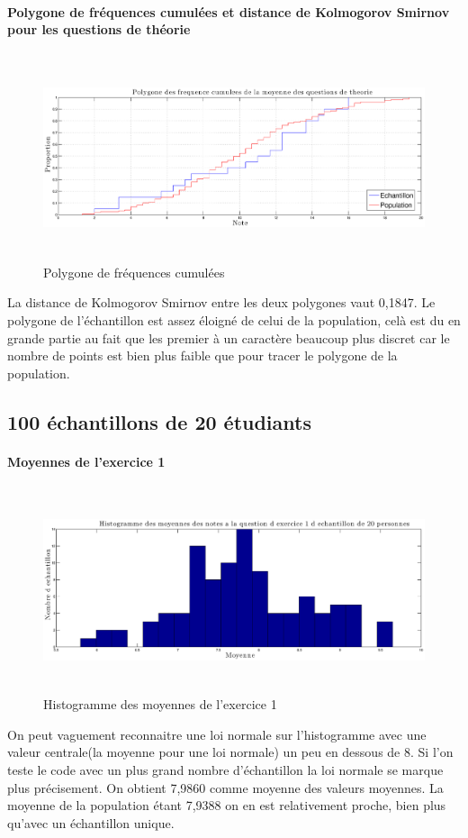 \documentclass[a4paper, 11pt]{article}
\begin{document}
	\paragraph{Polygone de fréquences cumulées et distance de Kolmogorov Smirnov pour les questions de théorie} 
	\begin{figure} [H]
	\begin{center}
		\includegraphics[height=6cm, width = 12cm]{Fig/Q2A3.eps}
		\caption{Polygone de fréquences cumulées}
		\label{Q2A3}
	\end{center}	
	\end{figure}
	La distance de Kolmogorov Smirnov entre les deux polygones vaut 0,1847. Le polygone de l'échantillon est assez éloigné de celui de la population, celà est du en grande partie au fait que les premier à un caractère beaucoup plus discret car le nombre de points est bien plus faible que pour tracer le polygone de la population.
	\subsection{100 échantillons de 20 étudiants}
\paragraph{Moyennes de l'exercice 1} 
	\begin{figure} [H]
	\begin{center}
		\includegraphics[height=6cm, width = 12cm]{Fig/Q2B1.eps}
		\caption{Histogramme des moyennes de l'exercice 1}
		\label{Q2B}
	\end{center}	
	\end{figure}
	On peut vaguement reconnaitre une loi normale sur l'histogramme avec une valeur centrale(la moyenne pour une loi normale) un peu en dessous de 8. Si l'on teste le code avec un plus grand nombre d'échantillon la loi normale se marque plus précisement. On obtient 7,9860 comme moyenne des valeurs moyennes. La moyenne de la population étant 7,9388 on en est relativement proche, bien plus qu'avec un échantillon unique.
\end{document}
